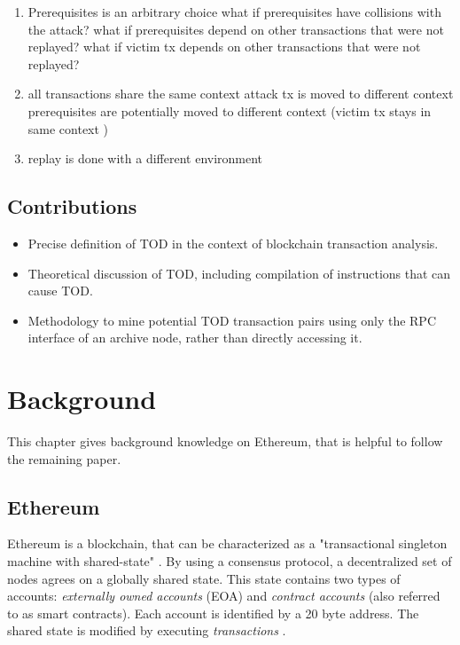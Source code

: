 \documentclass[draft,final]{vutinfth} %
\begin{document}
    \begin{enumerate}
        \item Prerequisites is an arbitrary choice
              \subitem what if prerequisites have collisions with the attack?
              \subitem what if prerequisites depend on other transactions that were not replayed?
              \subitem what if victim tx depends on other transactions that were not replayed?
        \item all transactions share the same context
              \subitem attack tx is moved to different context
              \subitem prerequisites are potentially moved to different context
              \subitem (victim tx stays in same context \checkmark)
        \item replay is done with a different environment
    \end{enumerate}
\fi

\section{Contributions}

\begin{itemize}
    \item Precise definition of TOD in the context of blockchain transaction analysis.
    \item Theoretical discussion of TOD, including compilation of instructions that can cause TOD.
    \item Methodology to mine potential TOD transaction pairs using only the RPC interface of an archive node, rather than directly accessing it.
\end{itemize}

\chapter{Background}

This chapter gives background knowledge on Ethereum, that is helpful to follow the remaining paper.

\section{Ethereum}

Ethereum is a blockchain, that can be characterized as a "transactional singleton machine with shared-state" \cite{wood_ethereum_2024}. By using a consensus protocol, a decentralized set of nodes agrees on a globally shared state. This state contains two types of accounts: \emph{externally owned accounts} (EOA) and \emph{contract accounts} (also referred to as smart contracts). Each account is identified by a 20 byte address. The shared state is modified by executing \emph{transactions} \cite{tikhomirov_ethereum_2018}.
\end{document}
